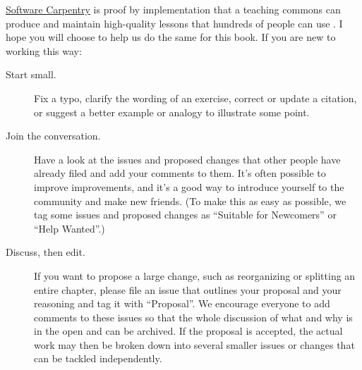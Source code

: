 \href{http://software-carpentry.org}{Software Carpentry} is proof by
implementation that a teaching commons can produce and maintain
high-quality lessons that hundreds of people can use \cite{Wils2016}.
I hope you will choose to help us do the same for this book.  If you
are new to working this way:

\begin{description}

\item[Start small.] Fix a typo, clarify the wording of an exercise,
  correct or update a citation, or suggest a better example or
  analogy to illustrate some point.

\item[Join the conversation.] Have a look at the issues and proposed
  changes that other people have already filed and add your comments
  to them.  It's often possible to improve improvements, and it's a
  good way to introduce yourself to the community and make new
  friends.  (To make this as easy as possible, we tag some issues and
  proposed changes as ``Suitable for Newcomers'' or ``Help Wanted''.)

\item[Discuss, then edit.] If you want to propose a large change, such
  as reorganizing or splitting an entire chapter, please file an issue
  that outlines your proposal and your reasoning and tag it with
  ``Proposal''.  We encourage everyone to add comments to these issues
  so that the whole discussion of what and why is in the open and can
  be archived.  If the proposal is accepted, the actual work may then
  be broken down into several smaller issues or changes that can be
  tackled independently.

\end{description}
